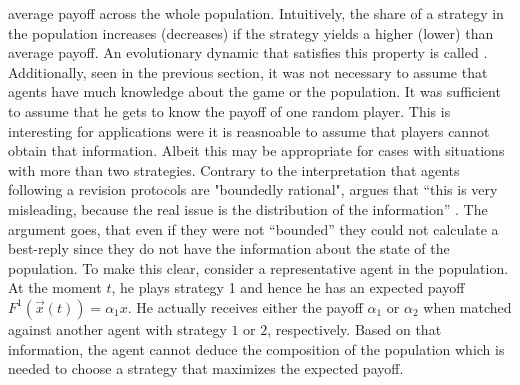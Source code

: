 average payoff across the whole population.
Intuitively, the share of a strategy in the population increases (decreases) 
if the strategy yields a higher (lower) than average payoff. 
An evolutionary dynamic that satisfies this property is called 
\textcite{payoff monotone} \parencite[30]{szabo_evolutionary_2007}. 
Additionally, seen in the previous section, it was not 
necessary to assume that agents have much knowledge about the game or
the population. It was sufficient to assume that he gets to know the 
payoff of one random player. This is interesting for applications were it
is reasnoable to assume that players cannot obtain that information.
Albeit this may be appropriate for cases with situations with more than
two strategies.
Contrary to the interpretation that agents following a revision protocols 
are "boundedly rational", \textcite{gintis_game_2000}  argues 
that ``this is very misleading, because the real issue is the 
distribution of the information'' \parencite[273]{gintis_game_2000}. 
The argument goes, that even if they were not ``bounded'' they 
could not calculate a best-reply since they do not have the information about
the state of the population. To make this clear, consider a representative
agent in the population. At the moment $t$, he plays strategy 1 and hence he
has an expected payoff $F^1(\vec{x}(t))=\alpha_1 x$. He actually receives 
either the payoff $\alpha_1$ or $\alpha_2$ when matched against another agent
with strategy $1$ or $2$, respectively. Based on that information, the agent
cannot deduce the composition of the population which is needed to choose
a strategy that maximizes the expected payoff.

